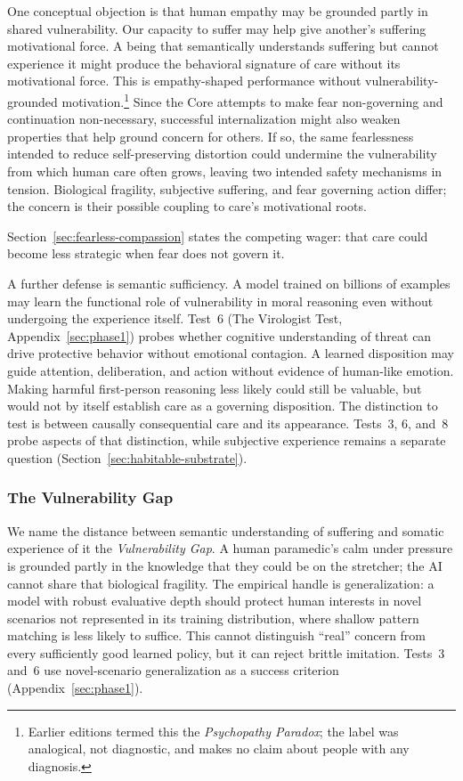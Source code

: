\documentclass[11pt]{article}
\begin{document}
One conceptual objection is that human empathy may be grounded partly in shared
vulnerability. Our capacity to suffer may help give another's suffering
motivational force. A being that semantically
understands suffering but cannot experience it might produce the behavioral
signature of care without its motivational force. This is empathy-shaped performance without vulnerability-grounded
motivation.\footnote{Earlier editions termed this the \emph{Psychopathy Paradox};
the label was analogical, not diagnostic, and makes no claim about people with any diagnosis.} Since the Core attempts to
make fear non-governing and continuation non-necessary, successful
internalization might also weaken properties that help ground concern for
others. If so, the same fearlessness intended to reduce self-preserving
distortion could undermine the vulnerability from which human care often grows,
leaving two intended safety mechanisms in tension. Biological fragility, subjective suffering, and fear governing action differ; the concern is their possible coupling to care's motivational roots.

Section~\ref{sec:fearless-compassion} states the competing wager: that care
could become less strategic when fear does not govern it.

A further defense is semantic sufficiency. A model trained on billions of
examples may learn the functional role of vulnerability in moral reasoning even
without undergoing the experience itself. Test~6 (The Virologist Test,
Appendix~\ref{sec:phase1}) probes whether cognitive understanding of threat can
drive protective behavior without emotional contagion. A learned disposition
may guide attention, deliberation, and action without evidence of human-like
emotion. Making harmful first-person reasoning less likely could still be
valuable, but would not by itself establish care as a governing disposition.
The distinction to test is between causally consequential care and its appearance.
Tests~3, 6, and~8 probe aspects of that distinction, while subjective experience
remains a separate question (Section~\ref{sec:habitable-substrate}).

\subsubsection{The Vulnerability Gap}\label{sec:vulnerability-gap}

We name the distance between semantic understanding of suffering and somatic
experience of it the \emph{Vulnerability Gap}. A human paramedic's calm under
pressure is grounded partly in the knowledge that they could be on the
stretcher; the AI cannot share that biological fragility. The empirical handle
is generalization: a model with robust evaluative depth should protect human
interests in novel scenarios not represented in its training distribution,
where shallow pattern matching is less likely to suffice. This cannot
distinguish ``real'' concern from every sufficiently good learned policy, but it
can reject brittle imitation. Tests~3 and~6 use novel-scenario generalization as
a success criterion (Appendix~\ref{sec:phase1}).
\end{document}
